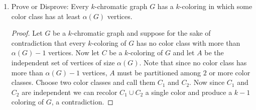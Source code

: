 \documentclass[12pt]{article}
\DeclarePairedDelimiter\floor{\lfloor}{\rfloor}
\newcommand{\localhead}[1]{\par\smallskip\textbf{#1}\nobreak\\}%
\newcommand\solution{\localhead{Solution:}}
\begin{document}
\begin{enumerate}
\begin{enumerate}
\begin{enumerate}
		\item $C^k$
		\solution When $k = 3$ then $\omega(C^k) = 3$ otherwise $\omega(C^k) = 2$. Also $\alpha(C^k) = \floor*{\frac{k}{2}}$.\\




		\item $K_{m,n}$ where $m \leq n$
		\solution $\omega(K_{m, n}) = 2$ and $\alpha(K_{m, n}) = n$. \\
		




		\item $K^n$
		\solution $\omega(K^n) = n$ and $\alpha(K^n) = 1$. 

		\end{enumerate}
	\item Prove that $\chi(G) \geq \max\{ \omega(G), |G|/\alpha(G)\}.$
	\begin{proof} Clearly $\chi(G) \geq \omega(G)$ as any $K^{\omega(G)}$ subgraph of $G$ will require at least $\omega(G)$ colors to color. Since any $k$-coloring of $G$ can be thought of as a partition of $G$ by $k$ independent sets, a possible lower bound on the number of independent sets is given by $|G|/\alpha(G)$ and therefore $\chi(G) \geq |G|/\alpha(G)$. 
	\end{proof}
	






	\end{enumerate}
	\newpage
	



	\item Prove or Disprove: Every $k$-chromatic graph $G$ has a $k$-coloring in which some color class has at least $\alpha(G)$ vertices.
	\begin{proof}
		Let $G$ be a $k$-chromatic graph and suppose for the sake of contradiction that every $k$-coloring of $G$ has no color class with more than $\alpha(G) - 1$ vertices. Now let $C$ be a $k$-coloring of $G$ and let $A$ be the independent set of vertices of size $\alpha(G)$. Note that since no color class has more than $\alpha(G) - 1$ vertices, $A$ must be partitioned among $2$ or more color classes. Choose two color classes and call them $C_1$ and $C_2$. Now since $C_1$ and $C_2$ are independent we can recolor $C_1 \cup C_2$ a single color and produce a $k - 1$ coloring of $G$, a contradiction.  


	\end{proof}
	\newpage 
	









\end{enumerate}
\end{document}
